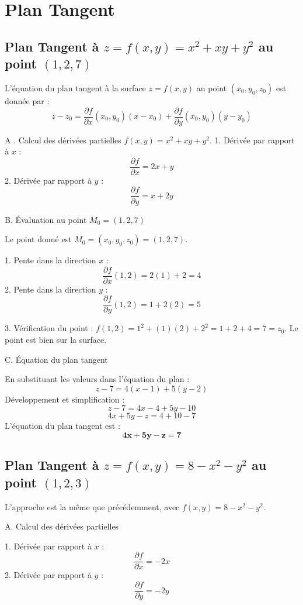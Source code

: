 \documentclass[french]{yLectureNote}
\begin{document}
\section{Plan Tangent}
\subsection{Plan Tangent à $z=f(x,y) = x^2 + xy + y^2$ au point $(1, 2, 7)$}

L'équation du plan tangent à la surface $z=f(x,y)$ au point $(x_0, y_0, z_0)$ est donnée par :
$$
z - z_0 = \frac{\partial f}{\partial x}(x_0, y_0)(x - x_0) + \frac{\partial f}{\partial y}(x_0, y_0)(y - y_0)
$$

A . Calcul des dérivées partielles
$f(x,y) = x^{2}+x y+y^{2}$.
1.  Dérivée par rapport à $x$ :
    $$
    \frac{\partial f}{\partial x} = 2x + y
    $$
2.  Dérivée par rapport à $y$ :
    $$
    \frac{\partial f}{\partial y} = x + 2y
    $$

 B. Évaluation au point $M_0 = (1, 2, 7)$

Le point donné est $M_0=(x_0,y_0,z_0)=(1,2,7)$.

1.  Pente dans la direction $x$ :
    $$
    \frac{\partial f}{\partial x}(1, 2) = 2(1) + 2 = 4
    $$
2.  Pente dans la direction $y$ :
    $$
    \frac{\partial f}{\partial y}(1, 2) = 1 + 2(2) = 5
    $$

3.  Vérification du point : $f(1, 2) = 1^2 + (1)(2) + 2^2 = 1 + 2 + 4 = 7 = z_0$. Le point est bien sur la surface.

 C. Équation du plan tangent

En substituant les valeurs dans l'équation du plan :
$$
z - 7 = 4(x - 1) + 5(y - 2)
$$
Développement et simplification :
$$
z - 7 = 4x - 4 + 5y - 10
$$
$$
4x + 5y - z = 4 + 10 - 7
$$
L'équation du plan tangent est :
$$
\mathbf{4x + 5y - z = 7}
$$

\subsection{Plan Tangent à $z=f(x,y) = 8-x^2-y^2$ au point $(1, 2, 3)$}

L'approche est la même que précédemment, avec $f(x,y)=8-x^{2}-y^{2}$.

A. Calcul des dérivées partielles

1.  Dérivée par rapport à $x$ :
    $$
    \frac{\partial f}{\partial x} = -2x
    $$
2.  Dérivée par rapport à $y$ :
    $$
    \frac{\partial f}{\partial y} = -2y
    $$
\end{document}
